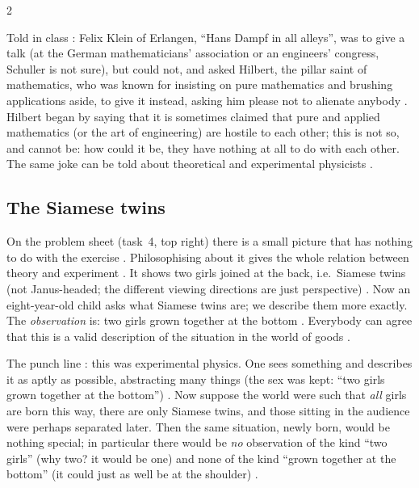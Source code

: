 \begin{paracol}{2}
\begin{aside}
Told in class : Felix Klein of Erlangen, ``Hans Dampf in all alleys'', was to give a talk (at the
German mathematicians' association or an engineers' congress, Schuller is not sure), but could not, and asked
Hilbert, the pillar saint of mathematics, who was known for insisting on pure mathematics and brushing applications
aside, to give it instead, asking him please not to alienate anybody .
Hilbert began by saying that it is sometimes claimed that pure and applied mathematics (or the art of engineering)
are hostile to each other; this is not so, and cannot be: how could it be, they have nothing at all to do with each
other. The same joke can be told about theoretical and experimental physicists .
\end{aside}

\subsection{The Siamese twins}\label{ssec:bv-twins}

On the problem sheet (task~4, top right) there is a small picture that has nothing to do with the exercise
. Philosophising about it gives the whole relation between theory and experiment
. It shows two girls joined at the back, i.e.\ Siamese twins (not Janus-headed; the
different viewing directions are just perspective) . Now an eight-year-old child asks
what Siamese twins are; we describe them more exactly. The \emph{observation} is: two girls grown together at the
bottom . Everybody can agree that this is a valid description of the
situation in the world of goods .

The punch line : this was experimental physics. One sees something and describes it as aptly as
possible, abstracting many things (the sex was kept: ``two girls grown together at the bottom'')
. Now suppose the world were such that \emph{all} girls are born this way, there are only Siamese
twins, and those sitting in the audience were perhaps separated later. Then the same situation, newly born, would
be nothing special; in particular there would be \emph{no} observation of the kind ``two girls'' (why two? it would
be one) and none of the kind ``grown together at the bottom'' (it could just as well be at the shoulder)
.


\end{paracol}
